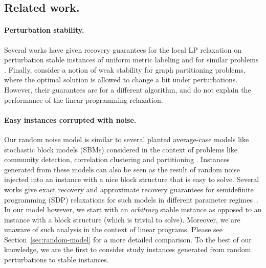 \subsection{Related work.}
\paragraph{Perturbation stability.}
Several works have given recovery guarantees for the local LP relaxation on perturbation stable instances of uniform metric labeling \citep{LanSonVij18, LanSonVij19} and for similar problems \citep{makarychev2014bilu, AngMakMak17}.
Finally, \citet{makarychev2014bilu} consider a notion of weak stability for graph partitioning problems, where the optimal solution is allowed to change a bit under perturbations. However, their guarantees are for a different algorithm, and do not explain the performance of the linear programming relaxation. 

\paragraph{Easy instances corrupted with noise.}
Our random noise model is similar to several planted average-case models like stochastic block models (SBMs) considered in the context of problems like community detection, correlation clustering and partitioning \citep[see e.g.,][]{Mcsherry,Abbesurvey, GRSY15}. Instances generated from these models can also be seen as the result of random noise injected into an instance with a nice block structure that is easy to solve. 
Several works give exact recovery and approximate recovery guarantees for semidefinite programming (SDP) relaxations for such models in different parameter regimes~\cite{Abbesurvey,guedon2016community}. 
In our model however, we start with an {\em arbitrary} stable instance as opposed to an instance with a block structure (which is trivial to solve). 
Moreover, we are unaware of such analysis in the context of linear programs.
Please see Section~\ref{sec:random-model} for a more detailed comparison. To the best of our knowledge, we are the first to consider study instances generated from random perturbations to stable instances.